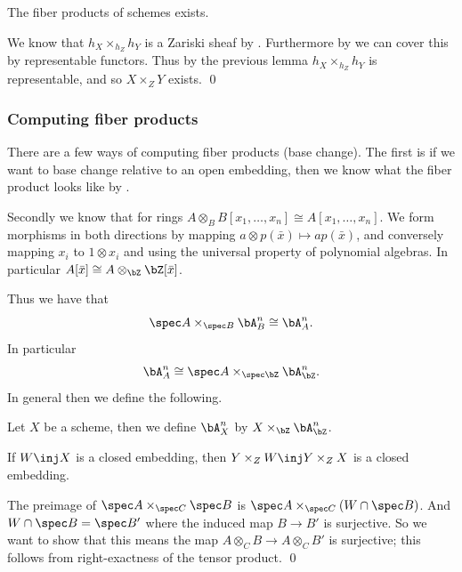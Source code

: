 \eproof

\bthrm

    The fiber products of schemes exists.

\ethrm

\bproof

    We know that $h_X\times_{h_Z}h_Y$ is a Zariski sheaf by .
    Furthermore by  we can cover this by representable functors.
    Thus by the previous lemma $h_X\times_{h_Z}h_Y$ is representable, and so $X\times_ZY$ exists.
    \qed

\eproof

\subsubsection{Computing fiber products}

There are a few ways of computing fiber products (base change).
The first is if we want to base change relative to an open embedding, then we know what the fiber product
looks like by .

Secondly we know that for rings $A\otimes_BB[x_1,\dots,x_n]\cong A[x_1,\dots,x_n]$.
We form morphisms in both directions by mapping $a\otimes p(\bar x)\mapsto ap(\bar x)$, and conversely
mapping $x_i$ to $1\otimes x_i$ and using the universal property of polynomial algebras.
In particular $A[\bar x]\cong A\otimes_\bZ\bZ[\bar x]$.

Thus we have that
$$ \spec A\times_{\spec B}\bA^n_B \cong \bA^n_A . $$
In particular
$$ \bA^n_A \cong \spec A\times_{\spec\bZ}\bA^n_\bZ . $$
In general then we define the following.

\bdefn

    Let $X$ be a scheme, then we define $\bA^n_X$ by $X\times_{\bZ}\bA^n_\bZ$.

\edefn

\bprop

    If $W\inj X$ is a closed embedding, then $Y\times_ZW\inj Y\times_ZX$ is a closed embedding.

\eprop

\bproof

    The preimage of $\spec A\times_{\spec C}\spec B$ is $\spec A\times_{\spec C}(W\cap\spec B)$.
    And $W\cap\spec B=\spec B'$ where the induced map $B\to B'$ is surjective.
    So we want to show that this means the map $A\otimes_CB\to A\otimes_CB'$ is surjective; this follows
    from right-exactness of the tensor product.
    \qed

